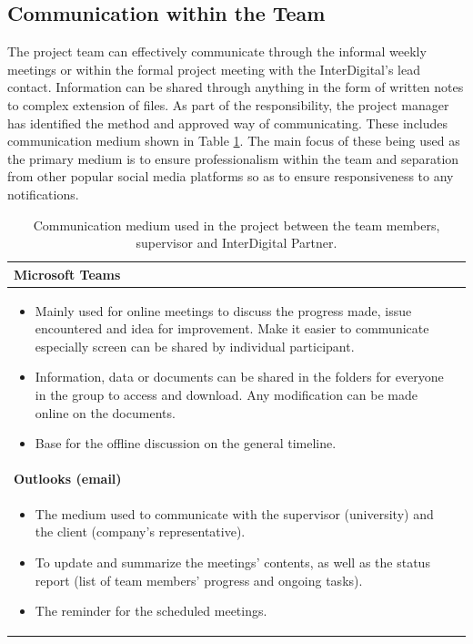 \subsection{Communication within the Team}
The project team can effectively communicate through the informal weekly meetings or within the formal project meeting with the InterDigital’s lead contact. Information can be shared through anything in the form of written notes to complex extension of files. As part of the responsibility, the project manager has identified the method and approved way of communicating. These includes communication medium shown in Table \ref{tab:communication}. The main focus of these being used as the primary medium is to ensure professionalism within the team and separation from other popular social media platforms so as to ensure responsiveness to any notifications.
\begin{table}[ht]
    \centering
    \begin{tabular}{p{14cm}l}
      \hline
      \textbf{Microsoft Teams}  \\
      \hline 
         \begin{itemize}
             \item Mainly used for online meetings to discuss the progress made, issue encountered and idea for improvement. Make it easier to communicate especially screen can be shared by individual participant.
             \item Information, data or documents can be shared in the folders for everyone in the group to access and download. Any modification can be made online on the documents.
             \item Base for the offline discussion on the general timeline.
         \end{itemize} \\
         \hline
      \textbf{Outlooks (email)}  \\
            \hline 
         \begin{itemize}
             \item The medium used to communicate with the supervisor (university) and the client (company’s representative).
             \item To update and summarize the meetings’ contents, as well as the status report (list of team members’ progress and ongoing tasks).
             \item The reminder for the scheduled meetings.
         \end{itemize} \\
         \hline
    \end{tabular}
    \caption{Communication medium used in the project between the team members, supervisor and InterDigital Partner.}
    \label{tab:communication}
\end{table}

